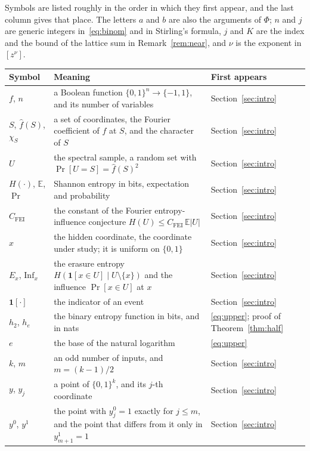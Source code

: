 \documentclass[11pt]{amsart}
\theoremstyle{remark}
\newcommand{\Inf}{\mathrm{Inf}}
\newcommand{\E}{\mathbb{E}}
\begin{document}
Symbols are listed roughly in the order in which they first appear, and the last column gives that place. The letters $a$ and $b$ are also the arguments of $\Phi$; $n$ and $j$ are generic integers in~\eqref{eq:binom} and in Stirling's formula, $j$ and $K$ are the index and the bound of the lattice sum in Remark~\ref{rem:near}, and $\nu$ is the exponent in $[z^\nu]$.

\begin{longtable}{@{}>{\raggedright\arraybackslash}p{}>{\raggedright\arraybackslash}p{}>{\raggedright\arraybackslash}p{}@{}}
\toprule
Symbol & Meaning & First appears \\
\midrule
\endhead
$f$, $n$ & a Boolean function $\{0,1\}^n\to\{-1,1\}$, and its number of variables & Section~\ref{sec:intro} \\
$S$, $\hat f(S)$, $\chi_S$ & a set of coordinates, the Fourier coefficient of $f$ at $S$, and the character of $S$ & Section~\ref{sec:intro} \\
$U$ & the spectral sample, a random set with $\Pr[U=S]=\hat f(S)^2$ & Section~\ref{sec:intro} \\
$H(\cdot)$, $\E$, $\Pr$ & Shannon entropy in bits, expectation and probability & Section~\ref{sec:intro} \\
$C_{\mathrm{FEI}}$ & the constant of the Fourier entropy-influence conjecture $H(U)\le C_{\mathrm{FEI}}\,\E|U|$ & Section~\ref{sec:intro} \\
$x$ & the hidden coordinate, the coordinate under study; it is uniform on $\{0,1\}$ & Section~\ref{sec:intro} \\
$E_x$, $\Inf_x$ & the erasure entropy $H(\mathbf 1[x\in U]\mid U\setminus\{x\})$ and the influence $\Pr[x\in U]$ at $x$ & Section~\ref{sec:intro} \\
$\mathbf 1[\cdot]$ & the indicator of an event & Section~\ref{sec:intro} \\
$h_2$, $h_e$ & the binary entropy function in bits, and in nats & \eqref{eq:upper}; proof of Theorem~\ref{thm:half} \\
$e$ & the base of the natural logarithm & \eqref{eq:upper} \\
$k$, $m$ & an odd number of inputs, and $m=(k-1)/2$ & Section~\ref{sec:intro} \\
$y$, $y_j$ & a point of $\{0,1\}^k$, and its $j$-th coordinate & Section~\ref{sec:intro} \\
$y^0$, $y^1$ & the point with $y^0_j=1$ exactly for $j\le m$, and the point that differs from it only in $y^1_{m+1}=1$ & Section~\ref{sec:intro} \\

\end{longtable}
\end{document}
